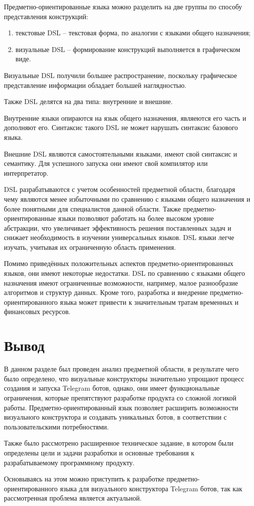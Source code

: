 Предметно-ориентированные языка можно разделить на две группы по способу представления конструкций:
\begin{enumerate}
    \item текстовые DSL -- текстовая форма, по аналогии с языками общего назначения;
    \item визуальные DSL -- формирование конструкций выполняется в графическом виде.
\end{enumerate}

Визуальные DSL получили большее распространение, поскольку графическое представление информации обладает большей наглядностью.

Также DSL делятся на два типа: внутренние и внешние.

Внутренние языки опираются на язык общего назначения, являеются его часть и дополняют его.
Синтаксис такого DSL не может нарушать синтаксис базового языка.

Внешние DSL являются самостоятельными языками, имеют свой синтаксис и семантику.
Для успешного запуска они имеют свой компилятор или интерпретатор.

DSL разрабатываются с учетом особенностей предметной области,
благодаря чему являются менее избыточными по сравнению с языками общего назначения и более понятными для специалистов данной области.
Также предметно-ориентированные языки позволяют работать на более высоком уровне абстракции,
что увеличивает эффективность решения поставленных задач и снижает необходимость в изучении универсальных языков.
DSL языки легче изучать, учитывая их ограниченную область применения.

Помимо приведённых положительных аспектов предметно-ориентированных языков, они имеют некоторые недостатки.
DSL по сравнению с языками общего назначения имеют ограниченные возможности, например, малое разнообразие алгоритмов и структур данных.
Кроме того, разработка и внедрение предметно-ориентированного языка может привести к значительным тратам временных и финансовых ресурсов.



\section*{Вывод}

В данном разделе был проведен анализ предметной области, в результате чего было определено,
что визуальные конструкторы значительно упрощают процесс создания и запуска Telegram ботов,
однако, они имеет функциональные ограничения, которые препятствуют разработке продукта со сложной логикой работы.
Предметно-ориентированный язык позволяет расширить возможности визуального конструктора и создавать уникальных ботов,
в соответствии с пользовательскими потребностями.

Также было рассмотрено расширенное техническое задание,
в котором были определены цели и задачи разработки и основные требования к разрабатываемому программному продукту.

Основываясь на этом можно приступить к разработке предметно-ориентированного языка для визуального конструктора Telegram ботов,
так как рассмотренная проблема является актуальной.